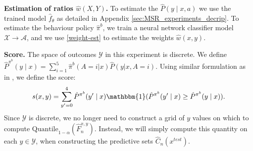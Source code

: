 \textbf{Estimation of ratios $\hat{w}(X, Y)$.}
To estimate the $\hat{P}(y \mid x, a)$ we use the trained model $\hat{f}_\theta$ as detailed in Appendix \ref{sec:MSR_experiments_decrip}. To estimate the behaviour policy $\hat{\pi}^b$, we train a neural network classifier model $\mathcal{X} \rightarrow \mathcal{A}$, and we use \eqref{weight-est} to estimate the weights $\hat{w}(x, y)$.

\textbf{Score.} The space of outcomes $\mathcal{Y}$ in this experiment is discrete. We define $\hat{P}^{\pi^b}(y \mid x) = \sum_{i = 1}^5 \hat{\pi}^b(A = i|x) \hat{P}(y|x, A = i)$. Using similar formulation as in \cite{conf-bates}, we define the score:
$$
s(x, y) = \sum_{y' = 0}^4 \hat{P}^{\pi^b}(y' \mid x) \mathbbm{1}(\hat{P}^{\pi^b}(y' \mid x) \geq \hat{P}^{\pi^b}(y \mid x)).
$$
Since $\mathcal{Y}$ is discrete, we no longer need to construct a grid of $y$ values on which to compute $\text{Quantile}_{1-\alpha}(\hat{F}_{n}^{x, y})$. Instead, we will simply compute this quantity on each $y \in \mathcal{Y}$, when constructing the predictive sets $\hat{C}_{n}(x^{test})$.


